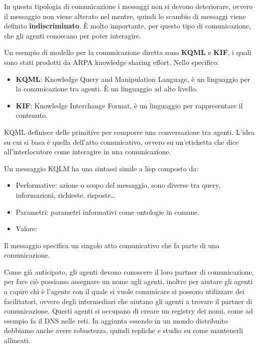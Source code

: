 In questa tipologia di comunicazione i messaggi non si devono deteriorare, ovvero
il messaggio non viene alterato nel mentre, quindi lo scambio di messaggi viene
definito \textbf{indiscriminato}. È molto importante, per questo tipo di
comunicazione, che gli agenti conoscano per poter interagire.
\begin{esempio}
    Un esempio di modello per la comunicazione diretta sono \textbf{KQML} e
    \textbf{KIF}, i quali sono stati prodotti da ARPA knowledge sharing effort.
    Nello specifico:
    \begin{itemize}
        \item \textbf{KQML}: Knowledge Query and Manipulation Language, è un
              linguaggio per la comunicazione tra agenti. È un linguaggio ad
              alto livello.
        \item \textbf{KIF}: Knowledge Interchange Format, è un linguaggio per
              rappresentare il contenuto.
    \end{itemize}

    KQML definisce delle primitive per comporre una conversazione tra agenti.
    L'idea su cui si basa è quella dell'atto comunicativo, ovvero su un'etichetta
    che dice all'interlocutore come interagire in una comunicazione.

    Un messaggio KQLM ha una sintassi simile a lisp composto da:
    \begin{itemize}
        \item Performative: azione o scopo del messaggio, sono diverse tra query,
              informazioni, richieste, risposte\dots
        \item Parametri: parametri informativi come ontologie in comune.
        \item Valore:
    \end{itemize}
    Il messaggio specifica un singolo atto comunicativo che fa parte di una comunicazione.
\end{esempio}

Come già anticipato, gli agenti devono conoscere il loro partner di comunicazione,
per fare ciò possiamo assegnare un nome agli agenti, inoltre per aiutare gli
agenti a capire chi è l'agente con il quale si vuole comunicare si possono
utilizzare dei facilitatori, ovvero degli intermediari che aiutano gli agenti
a trovare il partner di comunicazione. Questi agenti si occupano di creare un
registry dei nomi, come ad esempio fa il DNS nelle reti. In aggiunta essendo in
un mondo distribuito dobbiamo anche avere robustezza, quindi repliche e studio
su come mantenerli allineati.

